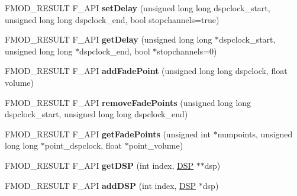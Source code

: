 \begin{DoxyCompactItemize}
\item 
\hypertarget{class_f_m_o_d_1_1_channel_control_a7775d96c75cc964c994fd2e47c96bebc}{F\+M\+O\+D\+\_\+\+R\+E\+S\+U\+L\+T F\+\_\+\+A\+P\+I {\bfseries set\+Delay} (unsigned long long dspclock\+\_\+start, unsigned long long dspclock\+\_\+end, bool stopchannels=true)}\label{class_f_m_o_d_1_1_channel_control_a7775d96c75cc964c994fd2e47c96bebc}

\item 
\hypertarget{class_f_m_o_d_1_1_channel_control_aea1bf9dd5a77d52029984a21ca3eae3b}{F\+M\+O\+D\+\_\+\+R\+E\+S\+U\+L\+T F\+\_\+\+A\+P\+I {\bfseries get\+Delay} (unsigned long long $\ast$dspclock\+\_\+start, unsigned long long $\ast$dspclock\+\_\+end, bool $\ast$stopchannels=0)}\label{class_f_m_o_d_1_1_channel_control_aea1bf9dd5a77d52029984a21ca3eae3b}

\item 
\hypertarget{class_f_m_o_d_1_1_channel_control_afad4c1f77a3087562ed0891701fbefab}{F\+M\+O\+D\+\_\+\+R\+E\+S\+U\+L\+T F\+\_\+\+A\+P\+I {\bfseries add\+Fade\+Point} (unsigned long long dspclock, float volume)}\label{class_f_m_o_d_1_1_channel_control_afad4c1f77a3087562ed0891701fbefab}

\item 
\hypertarget{class_f_m_o_d_1_1_channel_control_aaaadd3054bd1f696c1b9fd177c82995f}{F\+M\+O\+D\+\_\+\+R\+E\+S\+U\+L\+T F\+\_\+\+A\+P\+I {\bfseries remove\+Fade\+Points} (unsigned long long dspclock\+\_\+start, unsigned long long dspclock\+\_\+end)}\label{class_f_m_o_d_1_1_channel_control_aaaadd3054bd1f696c1b9fd177c82995f}

\item 
\hypertarget{class_f_m_o_d_1_1_channel_control_a2a340b1e78140e6dd21bcb708587b386}{F\+M\+O\+D\+\_\+\+R\+E\+S\+U\+L\+T F\+\_\+\+A\+P\+I {\bfseries get\+Fade\+Points} (unsigned int $\ast$numpoints, unsigned long long $\ast$point\+\_\+dspclock, float $\ast$point\+\_\+volume)}\label{class_f_m_o_d_1_1_channel_control_a2a340b1e78140e6dd21bcb708587b386}

\item 
\hypertarget{class_f_m_o_d_1_1_channel_control_a7f212be1dd1d1dc37540a853dd5e74d4}{F\+M\+O\+D\+\_\+\+R\+E\+S\+U\+L\+T F\+\_\+\+A\+P\+I {\bfseries get\+D\+S\+P} (int index, \hyperlink{class_f_m_o_d_1_1_d_s_p}{D\+S\+P} $\ast$$\ast$dsp)}\label{class_f_m_o_d_1_1_channel_control_a7f212be1dd1d1dc37540a853dd5e74d4}

\item 
\hypertarget{class_f_m_o_d_1_1_channel_control_ac7f2186367a2dfb5d954681336bba096}{F\+M\+O\+D\+\_\+\+R\+E\+S\+U\+L\+T F\+\_\+\+A\+P\+I {\bfseries add\+D\+S\+P} (int index, \hyperlink{class_f_m_o_d_1_1_d_s_p}{D\+S\+P} $\ast$dsp)}\label{class_f_m_o_d_1_1_channel_control_ac7f2186367a2dfb5d954681336bba096}


\end{DoxyCompactItemize}
